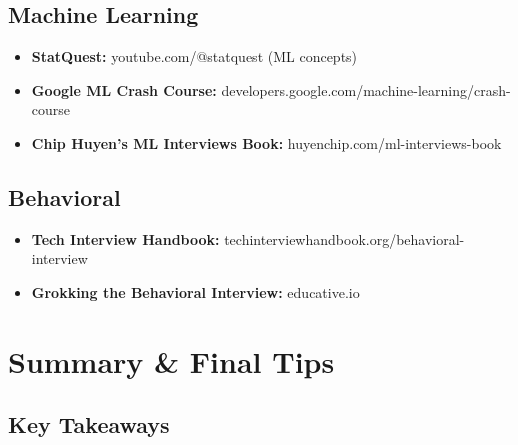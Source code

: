 \documentclass[11pt,letterpaper]{article}
\begin{document}
\subsection{Machine Learning}

\begin{itemize}
    \item \textbf{StatQuest:} youtube.com/@statquest (ML concepts)
    \item \textbf{Google ML Crash Course:} developers.google.com/machine-learning/crash-course
    \item \textbf{Chip Huyen's ML Interviews Book:} huyenchip.com/ml-interviews-book
\end{itemize}

\subsection{Behavioral}

\begin{itemize}
    \item \textbf{Tech Interview Handbook:} techinterviewhandbook.org/behavioral-interview
    \item \textbf{Grokking the Behavioral Interview:} educative.io
\end{itemize}

\section{Summary \& Final Tips}

\subsection{Key Takeaways}
\end{document}
